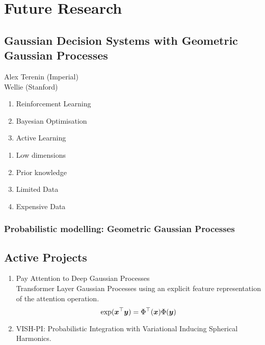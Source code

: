 \chapter{Future Research}

\section{Gaussian Decision Systems with Geometric Gaussian Processes}

Alex Terenin (Imperial)\\
Wellie (Stanford)


\begin{enumerate}
    \item Reinforcement Learning
    \item Bayesian Optimisation
    \item Active Learning
\end{enumerate}


\begin{enumerate}
    \item Low dimensions
    \item Prior knowledge
    \item Limited Data
    \item Expensive Data
\end{enumerate}


\subsection{Probabilistic modelling: Geometric Gaussian Processes}


\section{Active Projects}
\begin{enumerate}
    \item Pay Attention to Deep Gaussian Processes\\
    Transformer Layer Gaussian Processes using an explicit feature representation of the attention operation.
    \begin{equation*}
        \exp(\bm{x}^\top \bm{y}) = \Phi^\top(\bm{x}) \Phi(\bm{y})
    \end{equation*}

    \item VISH-PI: Probabilistic Integration with Variational Inducing Spherical Harmonics.
\end{enumerate}



